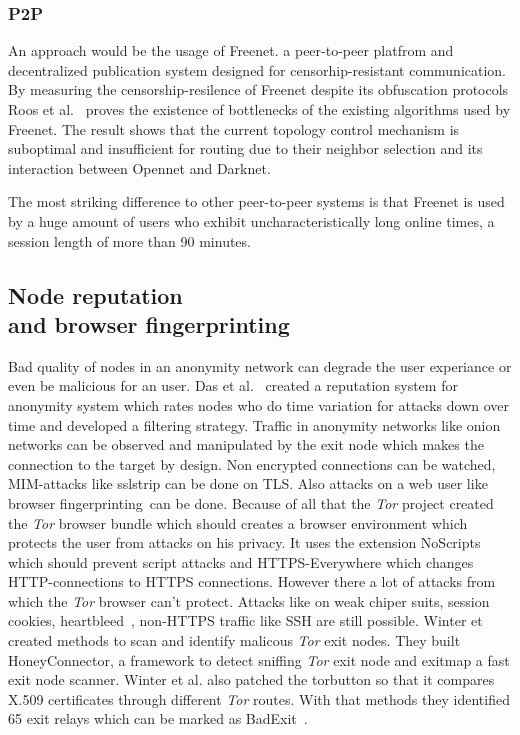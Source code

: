 \documentclass{sig-alternate}
\begin{document}
\subsubsection{P2P}
An approach would be the usage of Freenet. a peer-to-peer platfrom and decentralized publication system designed for censorhip-resistant communication. By measuring the censorship-resilence of Freenet despite its obfuscation protocols Roos et al.~\cite{roos2014measuring} proves the existence of bottlenecks of the existing algorithms used by Freenet. The result shows that the current topology control mechanism is suboptimal and insufficient for routing due to their neighbor selection and its interaction between Opennet and Darknet.

The most striking difference to other peer-to-peer systems is that Freenet is used by a huge amount of users who exhibit uncharacteristically long online times, a session length of more than 90 minutes.

\subsection{Node reputation \\and browser fingerprinting}

Bad quality of nodes in an anonymity network can degrade the user experiance or even be malicious for an user. Das et al.~\cite{das2014re} created a reputation system for anonymity system which rates nodes who do time variation for attacks down over time and developed a filtering strategy.
Traffic in anonymity networks like onion networks can be observed and manipulated by the exit node which makes the connection to the target by design. Non encrypted connections can be watched, MIM-attacks like sslstrip can be done on TLS. Also attacks on a web user like browser fingerprinting~\cite{fingerprinting}can be done. Because of all that the \textit{Tor} project created the \textit{Tor} browser bundle which should creates a browser environment which protects the user from attacks on his privacy. It uses the extension NoScripts which should prevent script attacks and HTTPS-Everywhere which changes HTTP-connections to HTTPS connections. However there a lot of attacks from which the \textit{Tor} browser can't protect. Attacks like on weak chiper suits, session cookies, heartbleed~\cite{heartbleed}, non-HTTPS traffic like SSH are still possible. Winter et created methods to scan and identify malicous \textit{Tor} exit nodes. They built HoneyConnector, a framework to detect sniffing \textit{Tor} exit node and exitmap a fast exit node scanner. Winter et al. also patched the torbutton so that it compares X.509 certificates through different \textit{Tor} routes. With that methods they identified 65 exit relays which can be marked as BadExit~\cite{winter2014spoiled}.
\end{document}
